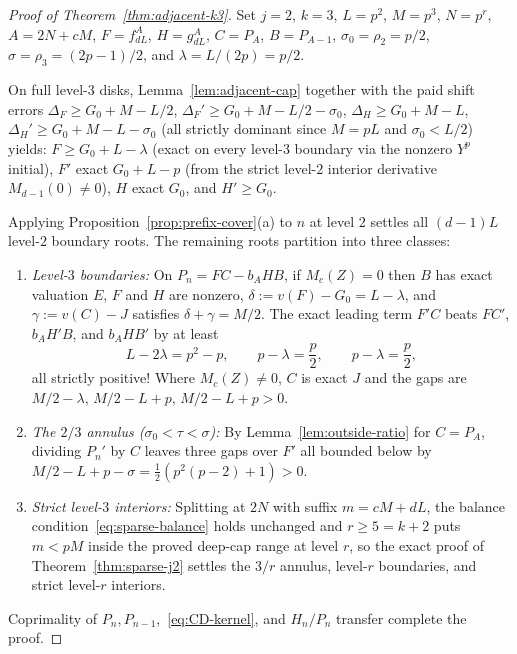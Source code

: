 \documentclass[11pt,reqno]{amsart}
\numberwithin{equation}{section}
\theoremstyle{definition}
\theoremstyle{remark}
\begin{document}
\begin{proof}[Proof of Theorem~\ref{thm:adjacent-k3}]
Set $j=2$, $k=3$, $L=p^2$, $M=p^3$, $N=p^r$, $A=2N+cM$, $F=f_{dL}^A$, $H=g_{dL}^A$, $C=P_A$, $B=P_{A-1}$, $\sigma_0=\rho_2=p/2$, $\sigma=\rho_3=(2p-1)/2$, and $\lambda=L/(2p)=p/2$.

On full level-$3$ disks, Lemma~\ref{lem:adjacent-cap} together with the paid shift errors $\Delta_F\ge G_0+M-L/2$, $\Delta_F'\ge G_0+M-L/2-\sigma_0$, $\Delta_H\ge G_0+M-L$, $\Delta_H'\ge G_0+M-L-\sigma_0$ (all strictly dominant since $M=pL$ and $\sigma_0<L/2$) yields: $F\ge G_0+L-\lambda$ (exact on every level-$3$ boundary via the nonzero $Y^p$ initial), $F'$ exact $G_0+L-p$ (from the strict level-$2$ interior derivative $M_{d-1}(0)\ne 0$), $H$ exact $G_0$, and $H'\ge G_0$.

Applying Proposition~\ref{prop:prefix-cover}(a) to $n$ at level $2$ settles all $(d-1)L$ level-$2$ boundary roots. The remaining roots partition into three classes:
\begin{enumerate}[label=(\arabic*),leftmargin=2em]
\item \emph{Level-$3$ boundaries:} On $P_n = FC - b_A HB$, if $M_c(Z)=0$ then $B$ has exact valuation $E$, $F$ and $H$ are nonzero, $\delta:=v(F)-G_0=L-\lambda$, and $\gamma:=v(C)-J$ satisfies $\delta+\gamma=M/2$. The exact leading term $F'C$ beats $FC'$, $b_A H'B$, and $b_A HB'$ by at least
\begin{equation}
\label{eq:adj-gaps}
L - 2\lambda = p^2 - p,\qquad p - \lambda = \frac{p}{2},\qquad p - \lambda = \frac{p}{2},
\end{equation}
all strictly positive! Where $M_c(Z)\ne 0$, $C$ is exact $J$ and the gaps are $M/2-\lambda$, $M/2-L+p$, $M/2-L+p > 0$.
\item \emph{The $2/3$ annulus ($\sigma_0<\tau<\sigma$):} By Lemma~\ref{lem:outside-ratio} for $C=P_A$, dividing $P_n'$ by $C$ leaves three gaps over $F'$ all bounded below by $M/2 - L + p - \sigma = \frac{1}{2}(p^2(p-2)+1) > 0$.
\item \emph{Strict level-$3$ interiors:} Splitting at $2N$ with suffix $m=cM+dL$, the balance condition~\eqref{eq:sparse-balance} holds unchanged and $r\ge 5 = k+2$ puts $m<pM$ inside the proved deep-cap range at level $r$, so the exact proof of Theorem~\ref{thm:sparse-j2} settles the $3/r$ annulus, level-$r$ boundaries, and strict level-$r$ interiors.
\end{enumerate}
Coprimality of $P_n, P_{n-1}$,~\eqref{eq:CD-kernel}, and $H_n/P_n$ transfer complete the proof.
\end{proof}
\end{document}
